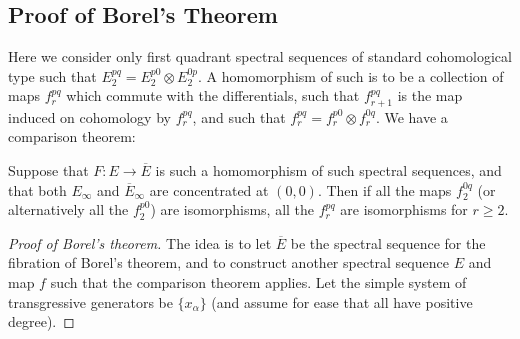 \documentclass[11pt]{article}
\begin{document}
{\subsection{Proof of Borel's Theorem}
Here we consider only first quadrant spectral sequences of standard cohomological type such that $E_2^{pq}=E_2^{p0}\otimes E_2^{0p}$. A homomorphism of such is to be a collection of maps $f_r^{pq}$ which commute with the differentials, such that $f^{pq}_{r+1}$ is the map induced  on cohomology by $f^{pq}_r$, and such that $f_r^{pq}=f_r^{p0}\otimes f_r^{0q}$. We have a comparison theorem:
\begin{thm*}
Suppose that $F:E\to\overline E$ is such a homomorphism of such spectral sequences, and that both $E_\infty$ and $\overline E_\infty$ are concentrated at $(0,0)$. Then if all the maps $f_2^{0q}$ (or alternatively all the $f_2^{p0}$) are isomorphisms, all the $f_r^{pq}$ are isomorphisms for $r\geq2$.
\end{thm*}
\begin{proof}[Proof of Borel's theorem]
\newcommand{\shrt}[1]{\makebox[0cm]{\ensuremath{#1}}}
The idea is to let $\overline E$ be the spectral sequence for the fibration of Borel's theorem, and to construct another spectral sequence $E$ and map $f$ such that the comparison theorem applies. Let the simple system of transgressive generators be $\{x_\alpha\}$ (and assume for ease that all have positive degree).


\end{proof}}
\end{document}
